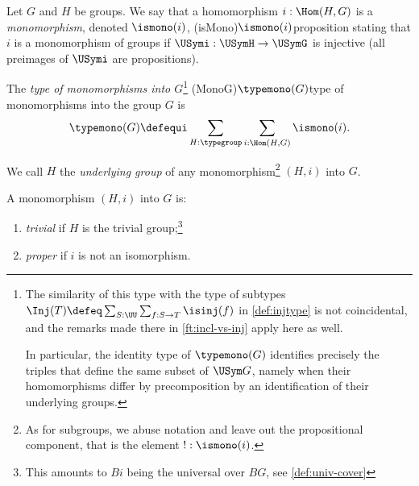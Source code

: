 \begin{definition}
  \label{def:typeofmono}
  Let $G$ and $H$ be groups. We say that a homomorphism $i: \Hom(H,G)$ is
  a \emph{monomorphism}, denoted $\ismono(i)$,%
  \glossary(isMono){$\protect\ismono(i)$}{proposition stating that
    $i$ is a monomorphism of groups}
  if $\USymi:\USymH\to \USymG$ is injective  
  (\ie all preimages of $\USymi$ are propositions).
  
  The \emph{type of monomorphisms into $G$}\footnote{%
    The similarity of this type with the type of subtypes
    $\Inj(T) \defeq \sum_{S:\UU}\sum_{f:S\to T}\isinj(f)$ in
    \cref{def:injtype} is not coincidental, and the remarks made 
    there in \cref{ft:incl-vs-inj} apply here as well.
    
    In particular, the identity type of $\typemono(G)$ identifies precisely the
    triples that define the same subset of $\USym G$, namely when their
    homomorphisms differ by precomposition by an identification of their
    underlying groups.
  }
  \glossary(MonoG){$\protect{\typemono(G)}$}{type of monomorphisms%
  into the group $G$} 
  is
  \[
  \typemono(G)\defequi\sum_{H:\typegroup}\sum_{i:\Hom(H,G)}\ismono(i).
  \]
  
  We call $H$ the \emph{underlying group} of any monomorphism\footnote{As for
    subgroups, we abuse notation and leave out the propositional component, that
    is the element $!:\ismono(i)$.}  $(H,i)$ into $G$.
  
  A monomorphism $(H,i)$ into $G$ is:
      \begin{enumerate}
      \item \emph{trivial} 
        if $H$ is the trivial group;\footnote{This amounts to $Bi$
      being the universal \covering over $BG$, see \cref{def:univ-cover}}
      \item \emph{proper} if $i$ is 
      not an isomorphism.\qedhere
      \end{enumerate}
\end{definition}
    
